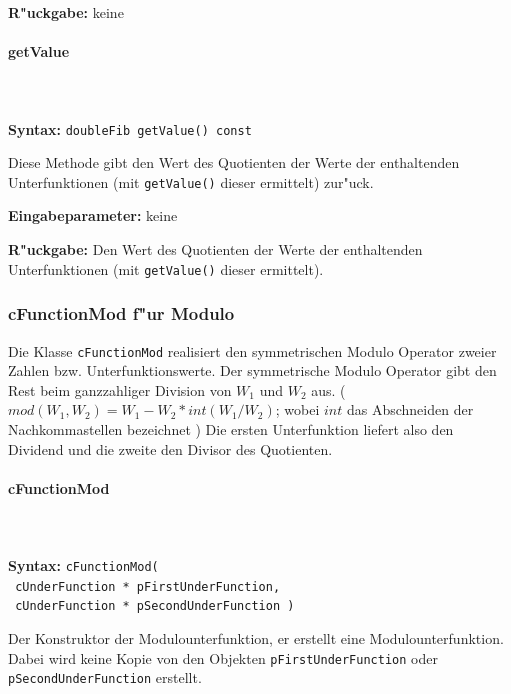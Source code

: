 \bigskip\noindent
\textbf{R"uckgabe:} keine


\paragraph{getValue}

\ \\\\\noindent
\textbf{Syntax:} \verb|doubleFib getValue() const|

\bigskip\noindent
Diese Methode gibt den Wert des Quotienten der Werte der enthaltenden Unterfunktionen (mit \verb|getValue()| dieser ermittelt) zur"uck.

\bigskip\noindent
\textbf{Eingabeparameter:} keine

\bigskip\noindent
\textbf{R"uckgabe:} Den Wert des Quotienten der Werte der enthaltenden Unterfunktionen (mit \verb|getValue()| dieser ermittelt).



\subsubsection{cFunctionMod f"ur Modulo}

Die Klasse \verb|cFunctionMod| realisiert den symmetrischen Modulo Operator zweier Zahlen bzw. Unterfunktionswerte. 
Der symmetrische Modulo Operator gibt den Rest beim ganzzahliger Division von $W_1$ und $W_2$ aus.
( $mod( W_1, W_2 ) = W_1 - W_2 * int(W_1/W_2)$; wobei $int$ das Abschneiden der Nachkommastellen bezeichnet ) Die ersten Unterfunktion liefert also den Dividend und die zweite den Divisor des Quotienten.

\paragraph{cFunctionMod}

\ \\\\\noindent
\textbf{Syntax:} \verb|cFunctionMod(| \\\verb| cUnderFunction * pFirstUnderFunction,| \\\verb| cUnderFunction * pSecondUnderFunction )|

\bigskip\noindent
Der Konstruktor der Modulounterfunktion, er erstellt eine Modulounterfunktion. Dabei wird keine Kopie von den Objekten \verb|pFirstUnderFunction| oder \verb|pSecondUnderFunction| erstellt.

